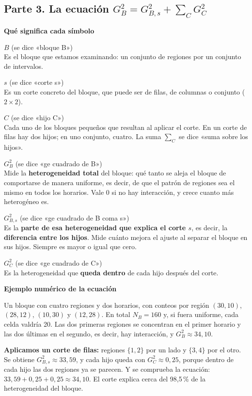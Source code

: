\documentclass[11pt,a4paper]{article}
\newcommand{\cajainicio}[3]{\par\medskip\noindent
  \begin{lrbox}{\cajabox}\begin{minipage}{\dimexpr\linewidth-2\fboxsep-2\fboxrule\relax}%
  \textbf{\color{#1}#3}\par\smallskip}
\newcommand{\cajafin}[2]{\end{minipage}\end{lrbox}\fcolorbox{#1}{#2}{\usebox{\cajabox}}\par\medskip}
\newenvironment{nota}[1]{\cajainicio{acc}{acc!7}{#1}}{\cajafin{acc}{acc!7}}
\begin{document}
\subsection*{Parte 3. La ecuación $G^2_B = G^2_{B,s} + \sum_C G^2_C$}

\begin{nota}{Qué significa cada símbolo}
$B$ \hfill\small(se dice «bloque B»)\normalsize\\
Es el bloque que estamos examinando: un conjunto de regiones por un conjunto de intervalos.

$s$ \hfill\small(se dice «corte s»)\normalsize\\
Es un corte concreto del bloque, que puede ser de filas, de columnas o conjunto ($2\times2$).

$C$ \hfill\small(se dice «hijo C»)\normalsize\\
Cada uno de los bloques pequeños que resultan al aplicar el corte. En un corte de filas hay dos hijos; en uno conjunto, cuatro. La suma $\sum_C$ se dice «suma sobre los hijos».

$G^2_B$ \hfill\small(se dice «ge cuadrado de B»)\normalsize\\
Mide la \textbf{heterogeneidad total} del bloque: qué tanto se aleja el bloque de comportarse de manera uniforme, es decir, de que el patrón de regiones sea el mismo en todos los horarios. Vale 0 si no hay interacción, y crece cuanto más heterogéneo es.

$G^2_{B,s}$ \hfill\small(se dice «ge cuadrado de B coma s»)\normalsize\\
Es la \textbf{parte de esa heterogeneidad que explica el corte $s$}, es decir, la \textbf{diferencia entre los hijos}. Mide cuánto mejora el ajuste al separar el bloque en sus hijos. Siempre es mayor o igual que cero.

$G^2_C$ \hfill\small(se dice «ge cuadrado de C»)\normalsize\\
Es la heterogeneidad que \textbf{queda dentro} de cada hijo después del corte.
\end{nota}

\begin{nota}{Ejemplo numérico de la ecuación}
Un bloque con cuatro regiones y dos horarios, con conteos por región $(30,10)$, $(28,12)$, $(10,30)$ y $(12,28)$. En total $N_B=160$ y, si fuera uniforme, cada celda valdría 20. Las dos primeras regiones se concentran en el primer horario y las dos últimas en el segundo, es decir, hay interacción, y $G^2_B\approx 34{,}10$.

\textbf{Aplicamos un corte de filas:} regiones $\{1,2\}$ por un lado y $\{3,4\}$ por el otro. Se obtiene $G^2_{B,s}\approx 33{,}59$, y cada hijo queda con $G^2_C\approx 0{,}25$, porque dentro de cada hijo las dos regiones ya se parecen. Y se comprueba la ecuación: $33{,}59+0{,}25+0{,}25\approx 34{,}10$. El corte explica cerca del 98,5\,\% de la heterogeneidad del bloque.
\end{nota}
\end{document}
